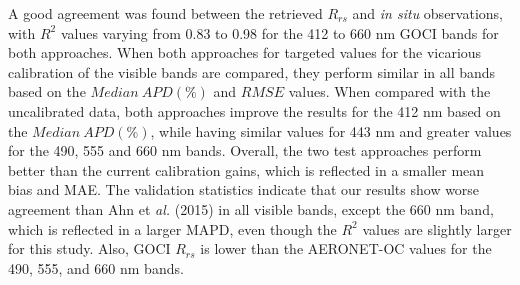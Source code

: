 \documentclass[10pt]{article}
\begin{document}
A good agreement was found between the retrieved $R_{rs}$ and {\it in situ} observations, with $R^2$ values varying from 0.83 to 0.98 for the 412 to 660 nm GOCI bands for both approaches. 
When both approaches for targeted values for the vicarious calibration of the visible bands are compared, they perform similar in all bands based on the $Median~APD(\%)$ and $RMSE$ values.
When compared with the uncalibrated data, both approaches improve the results for the 412 nm based on the $Median~APD(\%)$, while having similar values for 443 nm and greater values for the 490, 555 and 660 nm bands.
Overall, the two test approaches perform better than the current calibration gains, which is reflected in a smaller mean bias and MAE.
The validation statistics indicate that our results show worse agreement than Ahn et {\it al.} (2015) \cite{Ahn2015} in all visible bands, except the 660 nm band, which is reflected in a larger MAPD, even though the $R^2$ values are slightly larger for this study. 
Also, GOCI $R_{rs}$ is lower than the AERONET-OC values for the 490, 555, and 660 nm bands.
\end{document}
